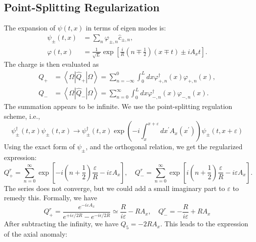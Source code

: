 \documentclass[aps,prb,superscriptaddress,nofootinbib]{revtex4}
\begin{document}
\subsection{Point-Splitting Regularization}
The expansion of $\psi(t,x)$ in terms of eigen modes is:
\begin{equation}
\begin{aligned}
	\psi_\pm(t,x) &= \sum_n \varphi_{\pm,n} \hat c_{\pm, n}, \\
	\varphi(t,x) &= \frac{1}{\sqrt{L}}\exp\left[\frac{i}{R}\left(n\mp \frac{1}{2}\right)(x\mp t)\pm iA_x t\right].
\end{aligned}
\end{equation}
The charge is then evaluated as
\begin{equation}
\begin{aligned}
Q_{+} &= \left\langle\Omega\left|\hat{Q}_{+}\right| \Omega\right\rangle=\sum_{n=-\infty}^0 \int_0^L d x \varphi_{+, n}^{\dagger}(x) \varphi_{+, n}(x), \\
Q_{-} &= \left\langle\Omega\left|\hat{Q}_{-}\right| \Omega\right\rangle=\sum_{n=0}^{\infty} \int_0^L d x \varphi_{-, n}^{\dagger}(x) \varphi_{-, n}(x).
\end{aligned}
\end{equation}
The summation appears to be infinite.
We use the point-splitting regulation scheme, i.e.,
\begin{equation}
	\psi_{\pm}^{\dagger}(t,x) \psi_{\pm}(t,x) \rightarrow \psi_{\pm}^{\dagger}(t,x) \exp \left(-i \int_x^{x+\varepsilon} d x^{\prime} A_x\left(x^{\prime}\right)\right) \psi_{\pm}(t,x+\varepsilon)
\end{equation}
Using the exact form of $\psi_\pm$, and the orthogonal relation, we get the regularized expression:
\begin{equation}
	Q_{+}^r=\sum_{n=0}^{\infty} \exp \left[-i\left(n+\frac{1}{2}\right) \frac{\varepsilon}{R}-i \varepsilon A_x\right], \quad Q_{-}^r=\sum_{n=0}^{\infty} \exp \left[i\left(n+\frac{1}{2}\right) \frac{\varepsilon}{R}-i \varepsilon A_x\right].
\end{equation}
The series does not converge, but we could add a small imaginary part to $\varepsilon$ to remedy this.
Formally, we have
\begin{equation}
	Q^r_+ = \frac{e^{-i\varepsilon A_x}}{e^{+i \varepsilon/2R}-e^{-i \epsilon/2R}} 
	\simeq \frac{R}{i \varepsilon}-R A_x, \quad
	Q_{-}^r=-\frac{R}{i \varepsilon}+R A_x
\end{equation}
After subtracting the infinity, we have $Q_5 = - 2R A_x$.
This leads to the expression of the axial anomaly:
\end{document}
